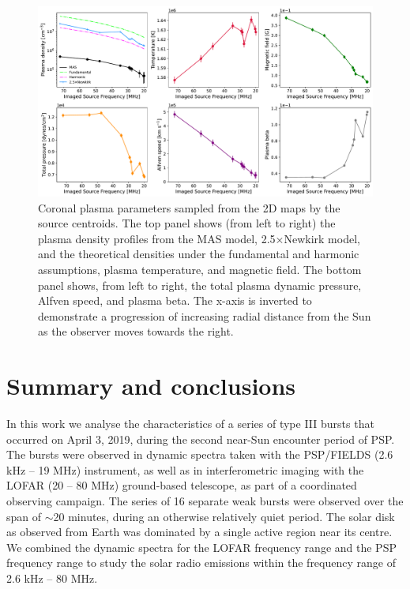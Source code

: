 \begin{figure}[ht]
\centering
\includegraphics[width=\textwidth]{chapter3/figs/scatterplots_FORWARD_plasma_diagnostics_2019-04-01_4R.pdf}
\caption{Coronal plasma parameters sampled from the 2D maps by the source centroids. The top panel shows (from left to right) the plasma density profiles from the MAS model, 2.5×Newkirk model, and the theoretical densities under the fundamental and harmonic assumptions, plasma temperature, and magnetic field. The bottom panel shows, from left to right, the total plasma dynamic pressure, Alfven speed, and plasma beta. The x-axis is inverted to demonstrate a progression of increasing radial distance from the Sun as the observer moves towards the right.}
\label{scatterplot}
\end{figure}

\section{Summary and conclusions}
\label{sec_ch3_conclusions}
In this work we analyse the characteristics of a series of type III bursts that occurred on April 3, 2019, during the second near-Sun encounter period of PSP. The bursts were observed in dynamic spectra taken with the PSP/FIELDS (2.6 kHz – 19 MHz) instrument, as well as in interferometric imaging with the LOFAR (20 – 80 MHz) ground-based telescope, as part of a coordinated observing campaign. The series of 16 separate weak bursts were observed over the span of $\sim$20 minutes, during an otherwise relatively quiet period. The solar disk as observed from Earth was dominated by a single active region near its centre. We combined the dynamic spectra for the LOFAR frequency range and the PSP frequency range to study the solar radio emissions within the frequency range of 2.6 kHz – 80 MHz. 

